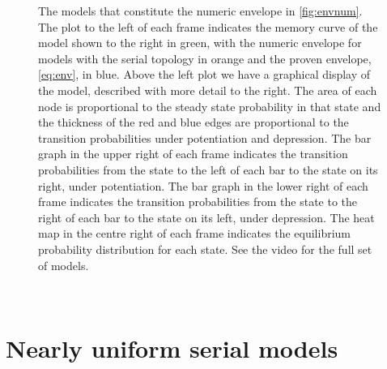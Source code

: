\documentclass[12pt]{article}
\begin{document}
\begin{figure}[tbp]
\begin{myenuma}
  \end{myenuma}
  \caption[Optimal models]{The models that constitute the numeric envelope in \cref{fig:envnum}.
  The plot to the left of each frame indicates the memory curve of the model shown to the right in green, with the numeric envelope for models with the serial topology in orange and the proven envelope, \eqref{eq:env}, in blue.
  Above the left plot we have a graphical display of the model, described with more detail to the right.
  The area of each node is proportional to the steady state probability in that state and the thickness of the red and blue edges are proportional to the transition probabilities under potentiation and depression.
  The bar graph in the upper right of each frame indicates the transition probabilities from the state to the left of each bar to the state on its right, under potentiation.
  The bar graph in the lower right of each frame indicates the transition probabilities from the state to the right of each bar to the state on its left, under depression.
  The heat map in the centre right of each frame indicates the equilibrium probability distribution for each state.
  See the video for the full set of models.}\label{fig:envvid}
\end{figure}
\


\section{Nearly uniform serial models}\label{sec:serial}
\end{document}
